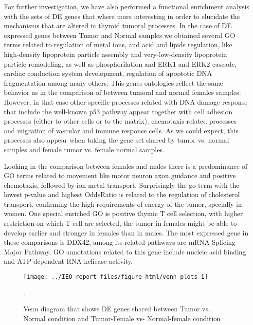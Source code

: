 \documentclass[9pt,twocolumn,twoside]{gsajnl}
\begin{document}
For further investigation, we have also performed a functional enrichment analysis with the sets of DE genes that where more interesting in order to elucidate the mechanisms that are altered in thyroid tumoral processes. In the case of DE expressed genes between Tumor and Normal samples we obtained several GO terms  %
related to regulation of metal ions, and acid and lipids regulation, like high-density lipoprotein particle assembly and very-low-density lipoprotein particle remodeling, as well as phosphorilation and ERK1 and ERK2 cascade, cardiac conduction system development, regulation of apoptotic DNA fragmentation among many others. This genes ontologies reflect the same behavior as in the comparison of between tumoral and normal females samples. %
However, in that case other specific processes related with DNA damage response that include the well-known p53 pathway appear together with cell adhesion processes (either to other cells or to the matrix), chemotaxis related processes and migration of vascular and immune response cells. 
As we could expect, this processes also appear when taking the gene set shared by tumor vs. normal samples and female tumor vs. female normal samples. 
	 	
Looking in the comparison between females and males there is a predominance of GO terms related to movement like motor neuron axon guidance and positive chemotaxis, followed by ion metal transport. Surprisingly the go term with the lowest p-value and highest OddsRatio is related to the regulation of cholesterol transport, confirming the high requirements of energy of the tumor, specially in women. One special enriched GO is positive thymic T cell selection, with higher restriction on which T-cell are selected, the tumor in females might be able to develop earlier and stronger in females than in males. The most expressed gene in these comparisons is DDX42, among its related pathways are mRNA Splicing - Major Pathway. GO annotations related to this gene include nucleic acid binding and ATP-dependent RNA helicase activity.


\begin{figure}
\centering
\texttt{[image: ../IEO\_report\_files/figure-html/venn\_plots-1]}
\caption{Venn diagram that shows DE genes shared between Tumor vs. Normal condition and Tumor-Female vs- Normal-female condition }.
\label{fig:venn1}
\end{figure}

  

\end{document}
